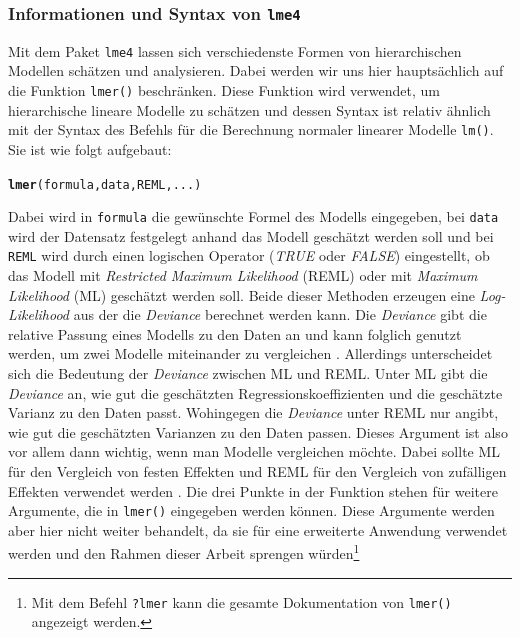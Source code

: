 \documentclass[12pt]{article}\usepackage[]{graphicx}\usepackage[]{color}
\makeatletter
\newcommand{\hlstd}[1]{\textcolor[rgb]{0.345,0.345,0.345}{#1}}%
\newcommand{\hlkwd}[1]{\textcolor[rgb]{0.737,0.353,0.396}{\textbf{#1}}}%
\newenvironment{kframe}{%
 \def\at@end@of@kframe{}%
 \ifinner\ifhmode%
  \def\at@end@of@kframe{\end{minipage}}%
  \begin{minipage}{\columnwidth}%
 \fi\fi%
 \def\FrameCommand##1{\hskip\@totalleftmargin \hskip-\fboxsep
 \colorbox{shadecolor}{##1}\hskip-\fboxsep
     \hskip-\linewidth \hskip-\@totalleftmargin \hskip\columnwidth}%
 \MakeFramed {\advance\hsize-\width
   \@totalleftmargin\z@ \linewidth\hsize
   \@setminipage}}%
 {\par\unskip\endMakeFramed%
 \at@end@of@kframe}
\newenvironment{knitrout}{}{} %
\makeatother
\begin{document}
\subsubsection{Informationen und Syntax von \texttt{lme4}}
Mit dem Paket \texttt{lme4} lassen sich verschiedenste Formen von hierarchischen Modellen schätzen und analysieren. Dabei werden wir uns hier hauptsächlich auf die Funktion \texttt{lmer()} beschränken. Diese Funktion wird verwendet, um hierarchische lineare Modelle zu schätzen und dessen Syntax ist relativ ähnlich mit der Syntax des Befehls für die Berechnung normaler linearer Modelle \texttt{lm()}. Sie ist wie folgt aufgebaut:

\begin{knitrout}
\color{fgcolor}\begin{kframe}
\begin{alltt}
\hlkwd{lmer}\hlstd{(formula, data, REML, ...)}
\end{alltt}
\end{kframe}
\end{knitrout}

Dabei wird in \texttt{formula} die gewünschte Formel des Modells eingegeben, bei \texttt{data} wird der Datensatz festgelegt anhand das Modell geschätzt werden soll und bei \texttt{REML} wird durch einen logischen Operator (\textit{TRUE} oder \textit{FALSE}) eingestellt, ob das Modell mit \textit{Restricted Maximum Likelihood} (REML) oder mit \textit{Maximum Likelihood} (ML) geschätzt werden soll. Beide dieser Methoden erzeugen eine \textit{Log-Likelihood} aus der die \textit{Deviance} berechnet werden kann. Die \textit{Deviance} gibt die relative Passung eines Modells zu den Daten an und kann folglich genutzt werden, um zwei Modelle miteinander zu vergleichen \citep{SnijdersTomA.B2012Ma:a}. Allerdings unterscheidet sich die Bedeutung der \textit{Deviance} zwischen ML und REML. Unter ML gibt die \textit{Deviance} an, wie gut die geschätzten Regressionskoeffizienten und die geschätzte Varianz zu den Daten passt. Wohingegen die \textit{Deviance} unter REML nur angibt, wie gut die geschätzten Varianzen zu den Daten passen. Dieses Argument ist also vor allem dann wichtig, wenn man Modelle vergleichen möchte. Dabei sollte ML für den Vergleich von festen Effekten und REML für den Vergleich von zufälligen Effekten verwendet werden \citep{PEUGH201085}. Die drei Punkte in der Funktion stehen für weitere Argumente, die in \texttt{lmer()} eingegeben werden können. Diese Argumente werden aber hier nicht weiter behandelt, da sie für eine erweiterte Anwendung verwendet werden und den Rahmen dieser Arbeit sprengen würden\footnote{Mit dem Befehl \texttt{?lmer} kann die gesamte Dokumentation von \texttt{lmer()} angezeigt werden.}
\end{document}
